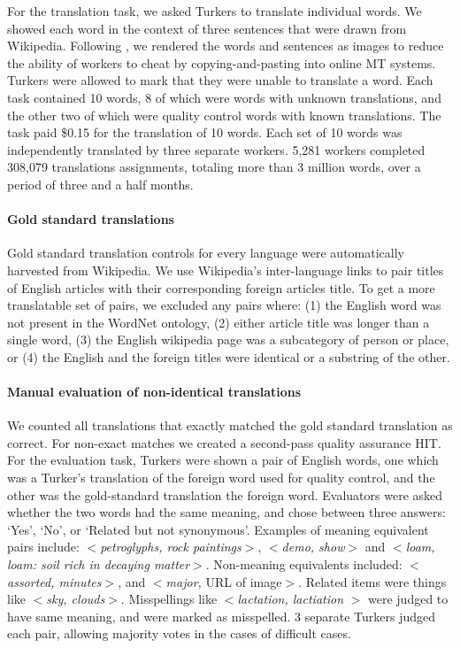 \documentclass[11pt]{article}
\begin{document}
For the translation task, we asked Turkers to translate individual words.  We showed each word in the context of three sentences that were drawn from Wikipedia.  Following , we rendered the words and sentences as images to reduce the ability of workers to cheat by copying-and-pasting into online MT systems. 
%
Turkers were allowed to mark that they were unable to translate a word. Each task contained 10 words, 8 of which were words with unknown translations, and the other two of which were quality control words with known translations.   
%
The task paid \$0.15 for the translation of 10 words.  
% 
Each set of 10 words was independently translated by three separate workers.  5,281 workers completed 308,079 translations assignments, totaling more than 3 million words, over a period of three and a half months.

\paragraph{Gold standard translations} 
Gold standard translation controls for every language were automatically harvested from Wikipedia. We use Wikipedia's inter-language links to pair titles of English articles with their corresponding foreign articles title.  To get a more translatable set of pairs, we excluded any pairs where: (1) the English word was not present in the WordNet ontology, (2) either article title was longer than a single word, (3) the English wikipedia page was a subcategory of person or place, or (4) the English and the foreign titles were identical or a substring of the other.

\paragraph{Manual evaluation of non-identical translations}
We counted all translations that exactly matched the gold standard translation as correct.  For non-exact matches we created a second-pass quality assurance HIT.  
For the evaluation task, Turkers were shown a pair of English words, one which was a Turker's translation of the foreign word used for quality control, and the other was the gold-standard translation the foreign word. Evaluators were asked whether the two words had the same meaning, and chose between three answers: `Yes', `No', or `Related but not synonymous'.  Examples of meaning equivalent pairs include: $<${\it petroglyphs, rock paintings}$>$, $<${\it demo, show}$>$ and  $<${\it loam, loam: soil rich in decaying matter}$>$.  Non-meaning equivalents included: $<${\it assorted, minutes}$>$, and $<${\it major,} URL of image$>$.  Related items were things like $<${\it sky, clouds}$>$. Misspellings like $<${\it lactation, lactiation} $>$ were judged to have same meaning, and were marked as misspelled.   3 separate Turkers judged each pair, allowing majority votes in the cases of difficult cases. 
\end{document}
